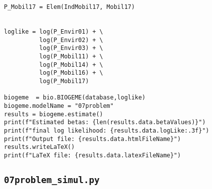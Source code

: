 \documentclass[12pt,a4paper]{article}
\begin{document}
\begin{lstlisting}[style=numbers]
P_Mobil17 = Elem(IndMobil17, Mobil17)


loglike = log(P_Envir01) + \
          log(P_Envir02) + \
          log(P_Envir03) + \
          log(P_Mobil11) + \
          log(P_Mobil14) + \
          log(P_Mobil16) + \
          log(P_Mobil17)

biogeme  = bio.BIOGEME(database,loglike)
biogeme.modelName = "07problem"
results = biogeme.estimate()
print(f"Estimated betas: {len(results.data.betaValues)}")
print(f"final log likelihood: {results.data.logLike:.3f}")
print(f"Output file: {results.data.htmlFileName}")
results.writeLaTeX()
print(f"LaTeX file: {results.data.latexFileName}")
\end{lstlisting}

\subsection{\lstinline$07problem_simul.py$}
\label{sec:07problem_simul}
\end{document}
